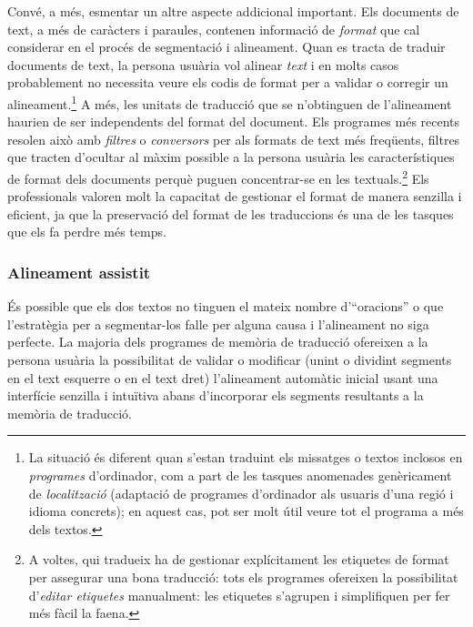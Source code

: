 Convé, a més, esmentar un altre aspecte addicional important. Els
documents de text, a més de caràcters i paraules, contenen informació
de \emph{format} que cal considerar en el procés de segmentació i
alineament.  Quan es tracta de traduir documents de text, la persona
usuària vol alinear \emph{text} i en molts casos probablement no
necessita veure els codis de format per a validar o corregir un
alineament.\footnote{La situació és diferent quan s'estan traduint els
  missatges o textos inclosos en \emph{programes} d'ordinador, com a
  part de les tasques anomenades genèricament de \emph{localització}
  (adaptació de programes d'ordinador als usuaris d'una regió i idioma
  concrets); en aquest cas, pot ser molt útil veure tot el programa a
  més dels textos.}  A més, les unitats de traducció que se
n'obtinguen de l'alineament haurien de ser independents del format del
document. Els programes més recents resolen això amb \emph{filtres} o
\emph{conversors} per als formats de text més freqüents, filtres que
tracten d'ocultar al màxim possible a la persona usuària les
característiques de format dels documents perquè puguen concentrar-se
en les textuals.\footnote{A voltes, qui tradueix ha de gestionar
  explícitament les etiquetes de format per assegurar una bona
  traducció: tots els programes ofereixen la possibilitat
  d'\emph{editar etiquetes} manualment: les etiquetes s'agrupen i
  simplifiquen per fer més fàcil la faena.} Els professionals valoren
molt la capacitat de gestionar el format de manera senzilla i
eficient, ja que la preservació del format de les traduccions és una
de les tasques que els fa perdre més temps.

\subsubsection{Alineament assistit}

És possible que els dos textos no tinguen el mateix nombre
d'``oracions'' o que l'estratègia per a segmentar-los falle per alguna
causa i l'alineament no siga perfecte. La majoria dels programes de
memòria de traducció ofereixen a la persona usuària la possibilitat de
validar o modificar (unint o dividint segments en el text esquerre o
en el text dret) l'alineament automàtic inicial usant una interfície
senzilla i intuïtiva abans d'incorporar els segments resultants a la
memòria de traducció.

